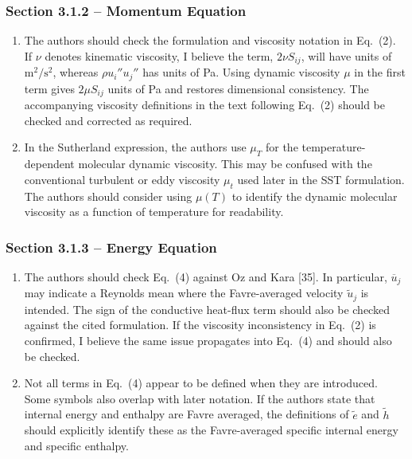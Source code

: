 \documentclass[11pt]{article}
\begin{document}
	\subsubsection*{Section 3.1.2 -- Momentum Equation}
	
	\begin{enumerate}
		\item The authors should check the formulation and viscosity notation in Eq.~(2). If $\nu$ denotes kinematic viscosity, I believe the term,  $2\nu S_{ij}$, will have units of $\mathrm{m^2/s^2}$, whereas $\rho u_i''u_j''$ has units of Pa. Using dynamic viscosity $\mu$ in the first term gives $2\mu S_{ij}$ units of Pa and restores dimensional consistency. The accompanying viscosity definitions in the text following Eq.~(2) should be checked and corrected as required.
		
		\item In the Sutherland expression, the authors use $\mu_T$ for the temperature-dependent molecular dynamic viscosity. This may be confused with the conventional turbulent or eddy viscosity $\mu_t$ used later in the SST formulation. The authors should consider using $\mu(T)$ to identify the dynamic molecular viscosity as a function of temperature for readability.
	\end{enumerate}
	
	
	\subsubsection*{Section 3.1.3 -- Energy Equation}
	
	\begin{enumerate}
		\item The authors should check Eq.~(4) against Oz and Kara [35]. In particular, $\overline{u}_j$ may indicate a Reynolds mean where the Favre-averaged velocity $\widetilde{u}_j$ is intended. The sign of the conductive heat-flux term should also be checked against the cited formulation. If the viscosity inconsistency in Eq.~(2) is confirmed, I believe the same issue propagates into Eq.~(4) and should also be checked.
		
		\item Not all terms in Eq.~(4) appear to be defined when they are introduced. Some symbols also overlap with later notation. If the authors state that internal energy and enthalpy are Favre averaged, the definitions of $\widetilde{e}$ and $\widetilde{h}$ should explicitly identify these as the Favre-averaged specific internal energy and specific enthalpy.
	\end{enumerate}
	
\end{document}
